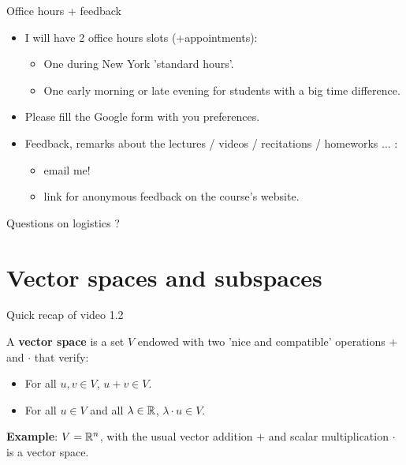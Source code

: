 \documentclass{beamer}
\begin{document}
\begin{frame}[t]{Office hours + feedback}
	\begin{itemize}
		\item I will have 2 office hours slots (+appointments):
			\begin{itemize}
				\item One during New York 'standard hours'.
				\item One early morning or late evening for students with a big time difference.
			\end{itemize}
			\vspace{1cm}
		\item Please fill the Google form with you preferences.
			\vspace{1cm}
		\item Feedback, remarks about the lectures / videos / recitations / homeworks ... :
			\begin{itemize}
				\item email me!
				\item link for anonymous feedback on the course's website.
			\end{itemize}
	\end{itemize}
\end{frame}

\begin{frame}[t]{Questions on logistics ?}
	\grid
\end{frame}

\section{Vector spaces and subspaces}

\begin{frame}[t]{Quick recap of video 1.2}
	\grid
	\vspace{-0.7cm}
	\begin{exampleblock}{}
		A \textbf{vector space} is a set $V$ endowed with two 'nice and compatible' operations $+$ and $\cdot$ that verify:
		\begin{itemize}
			\item For all $u,v \in V$, $u+v \in V$.
			\item For all $u \in V$ and all $\lambda \in \mathbb{R}$, $\lambda \cdot u \in V$.
		\end{itemize}
	\end{exampleblock}
	\textbf{Example}: $V = \mathbb{R}^n$, with the usual vector addition $+$ and scalar multiplication $\cdot$ is a vector space.
\end{frame}
\end{document}
